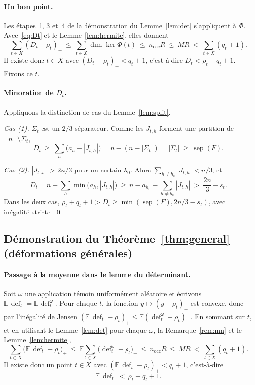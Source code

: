 \documentclass[11pt,a4paper]{article}
\theoremstyle{definition}
\theoremstyle{remark}
\newcommand{\E}{\mathbb{E}}
\newcommand{\sep}{\operatorname{sep}}
\newcommand{\dfc}{\operatorname{def}}
\newcommand{\nocc}{n_{\mathrm{occ}}}
\begin{document}
\paragraph{Un bon point.} Les étapes~1, 3 et~4 de la démonstration du Lemme~\ref{lem:det}
s'appliquent à $\Phi$. Avec~\eqref{eq:Dt} et le Lemme~\ref{lem:hermite}, elles donnent
\[
\sum_{t\in X}(D_t-\rho_t)_+\ \le\ \sum_{t\in X}\dim\ker\Phi(t)\ \le\ \nocc R\ \le\ MR
\ <\ \sum_{t\in X}(q_t+1).
\]
Il existe donc $t\in X$ avec $(D_t-\rho_t)_+<q_t+1$, c'est-à-dire $D_t<\rho_t+q_t+1$. Fixons
ce $t$.

\paragraph{Minoration de $D_t$.} Appliquons la distinction de cas du Lemme~\ref{lem:split}.

\emph{Cas (1).} $\Sigma_t$ est un $2/3$-séparateur. Comme les $J_{t,h}$ forment une partition
de $[n]\setminus\Sigma_t$,
\[
D_t\ \ge\ \sum_h\bigl(a_h-|J_{t,h}|\bigr)=n-(n-|\Sigma_t|)=|\Sigma_t|\ \ge\ \sep(F).
\]

\emph{Cas (2).} $|J_{t,h_0}|>2n/3$ pour un certain $h_0$. Alors
$\sum_{h\ne h_0}|J_{t,h}|<n/3$, et
\[
D_t=n-\sum_h\min\bigl(a_h,|J_{t,h}|\bigr)\ \ge\ n-a_{h_0}-\sum_{h\ne h_0}|J_{t,h}|
\ >\ \frac{2n}{3}-s_t .
\]
Dans les deux cas, $\rho_t+q_t+1>D_t\ge\min(\sep(F),2n/3-s_t)$, avec inégalité stricte. \qed

\subsection{Démonstration du Théorème~\ref{thm:general} (déformations générales)}

\paragraph{Passage à la moyenne dans le lemme du déterminant.} Soit $\omega$ une application
témoin uniformément aléatoire et écrivons $\E\,\dfc_t=\E\,\dfc^\omega_t$. Pour chaque $t$,
la fonction $y\mapsto(y-\rho_t)_+$ est convexe, donc par l'inégalité de Jensen
$(\E\,\dfc_t-\rho_t)_+\le\E(\dfc^\omega_t-\rho_t)_+$. En sommant sur $t$, et en utilisant le
Lemme~\ref{lem:det} pour chaque $\omega$, la Remarque~\ref{rem:mn} et le
Lemme~\ref{lem:hermite},
\[
\sum_{t\in X}\bigl(\E\,\dfc_t-\rho_t\bigr)_+\ \le\ \E\sum_{t\in X}\bigl(\dfc^\omega_t-\rho_t\bigr)_+
\ \le\ \nocc R\ \le\ MR\ <\ \sum_{t\in X}(q_t+1).
\]
Il existe donc un point $t\in X$ avec $(\E\,\dfc_t-\rho_t)_+<q_t+1$, c'est-à-dire
\begin{equation}\label{eq:goodpoint}
\E\,\dfc_t\ <\ \rho_t+q_t+1 .
\end{equation}
\end{document}
